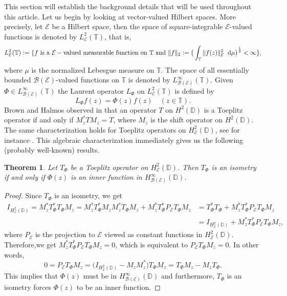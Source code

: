 \documentclass[12pt]{amsart}
\numberwithin{equation}{section}
\newtheorem{thm}[propn]{Theorem}
\theoremstyle{definition}
\newcommand{\D}{\mathbb{D}}
\newcommand{\T}{\mathbb{T}}
\newcommand{\1}{{\mbox{\bf 1}}}
\newcommand{\clb}{\mathcal{B}}
\newcommand{\cle}{\mathcal{E}}
\begin{document}
This section will establish the background details that will be used throughout this article. Let us begin by looking at vector-valued Hilbert spaces. More precisely, let $\cle$ be a Hilbert space, then the space of square-integrable $\cle$-valued functions is denoted by $L_{\cle}^2(\mathbb{T})$, that is, 
\[
L_{\cle}^2(\mathbb{T}):= \{f \text{ is a } \cle-\text{valued measurable function on } \T \text{ and } \|f\|_2:= \big( \int_{\mathbb{T}} {\|f(z)\|_{\cle}^2 } \hspace{2mm} \mathrm{d} \mu \big)^{\frac{1}{2}} < \infty \},
\]
where $\mu$ is the normalized Lebesgue measure on $\mathbb{T}$. The space of all essentially bounded $\clb(\cle)$-valued functions on $\T$ is denoted by $L_{\clb(\cle)}^{\infty}(\T)$. Given $\Phi \in L_{\clb(\cle)}^{\infty}(\T)$ the Laurent operator $L_{\Phi}$ on $L_{\cle}^2(\T)$ is defined by 
\[
L_{\Phi} f(z) = \Phi(z) f(z) \quad (z \in \T).
\]
Brown and Halmos observed in \cite{BH} that an operator $T$ on $H^2(\D)$ is a Toeplitz operator if and only if $M_z^* T M_z = T$, where $M_z$ is the shift operator on $H^2(\D)$. The same characterization holds for Toeplitz operators on $H_{\cle}^2(\D)$, see for instance \cite{Page}. This algebraic characterization immediately gives us the following (probably well-known) results.
\begin{thm}\label{isometry}
Let $T_{\Phi}$ be a Toeplitz operator on $H_{\cle}^2(\D)$. Then $T_{\Phi}$ is an isometry if and only if $\Phi(z)$ is an inner function in $H_{\clb(\cle)}^{\infty}(\D)$. 
\end{thm}
\begin{proof}
Since $T_{\Phi}$ is an isometry, we get
\begin{align*}
I_{H_{\cle}^2(\D)}  = M_{z}^*T_{\Phi}^* T_{\Phi}M_z = M_{z}^*T_{\Phi}^* M_z M_z^* T_{\Phi}M_z + M_{z}^*T_{\Phi}^* P_{\cle} T_{\Phi}M_z &= T_{\Phi}^* T_{\Phi} + M_{z}^*T_{\Phi}^* P_{\cle} T_{\Phi}M_z \\
&= I_{H_{\cle}^2(\D)} + M_{z}^*T_{\Phi}^* P_{\cle} T_{\Phi}M_z,
\end{align*}
where $P_{\cle}$ is the projection to $\cle$ viewed as constant functions in $H_{\cle}^2(\D)$.
Therefore,we get $M_{z}^*T_{\Phi}^* P_{\cle} T_{\Phi}M_z=0$, which is equivalent to $P_{\cle} T_{\Phi}M_z=0$. In other words,
\[
0 = P_{\cle} T_{\Phi}M_z = \big(I_{H_{\cle}^2(\D)} -M_z M_z^* \big)T_{\Phi}M_z = T_{\Phi}M_z - M_z T_{\Phi}.
\]
This implies that $\Phi(z)$ must be in $H_{\clb(\cle)}^{\infty}(\D)$ and furthermore, $T_{\Phi}$ is an isometry forces $\Phi(z)$ to be an inner function.
\end{proof}
\end{document}
